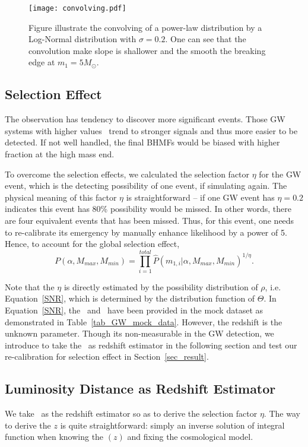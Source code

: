 \documentclass[twocolumn]{aastex62}
\begin{document}
\begin{figure}%
\texttt{[image: convolving.pdf]}
\caption{
Figure illustrate the convolving of a power-law distribution by a Log-Normal distribution with $\sigma = 0.2$. One can see that the convolution make slope is shallower and the smooth the breaking edge at $m_1 = 5 M_{\odot}$.
}
\label{fig:result_slope}
\end{figure}

\subsection{Selection Effect}\label{sec_likelihood_sf}
The observation has tendency to discover more significant events. Those GW systems with higher values \mone\ trend to stronger signals and thus more easier to be detected. If not well handled, the final BHMFs would be biased with higher fraction at the high mass end.

To overcome the selection effects, we calculated the selection factor $\eta$ for the GW event, which is the detecting possibility of one event, if simulating again. The physical meaning of this factor $\eta$ is straightforward -- if one GW event has $\eta=0.2$ indicates this event has 80\% possibility would be missed. In other words, there are four equivalent events that has been missed. Thus, for this event, one needs to re-calibrate its emergency by manually enhance likelihood by a power of 5. Hence, to account for the global selection effect, 
 \begin{equation} \label{equ_powlaw_like}
 P(\alpha, M_{max}, M_{min}) =  \prod_{i=1}^{total} \hat{P}(m_{1,i}|\alpha, M_{max}, M_{min})^{1/\eta}.
 \end{equation}

Note that the $\eta$ is directly estimated by the possibility distribution of $\rho$, i.e. Equation~\ref{SNR}, which is determined by the distribution function of $\Theta$. In Equation~\ref{SNR}, the \cmass\ and \dl\ have been provided in the mock dataset as demonstrated in Table~\ref{tab_GW_mock_data}. However, the redshift is the unknown parameter. Though its non-measurable in the GW detection, we introduce to take the \dl\ as redshift estimator in the following section and test our re-calibration for selection effect in Section~\ref{sec_result}.

\subsection{Luminosity Distance as Redshift Estimator} 
We take \dl\ as the redshift estimator so as to derive the selection factor $\eta$. The way to derive the $z$ is quite straightforward: simply an inverse solution of integral function when knowing the \dl$(z)$ and fixing the cosmological model.
\end{document}
